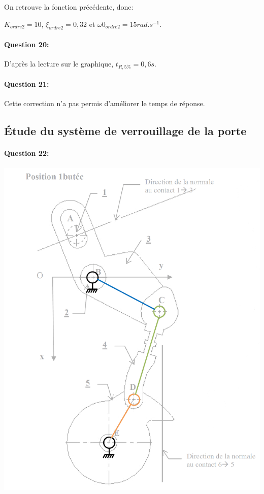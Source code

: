 On retrouve la fonction précédente, donc:

$K_{ordre2}=10$, $\xi_{ordre2}=0,32$ et $\omega0_{ordre2}=15rad.s^{-1}$.

\paragraph{Question 20:}

D'après la lecture sur le graphique, $t_{R,5\%}=0,6s$.

\paragraph{Question 21:}

Cette correction n'a pas permis d'améliorer le temps de réponse.

\subsection{Étude du système de verrouillage de la porte}

\paragraph{Question 22:}

\begin{center}
 \includegraphics[width=0.7\linewidth]{img/cin}
\end{center}

